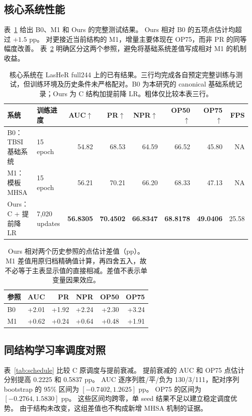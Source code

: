 \documentclass[journal]{IEEEtran}
\begin{document}
\subsection{核心系统性能}
表~\ref{tab:main} 给出 B0、M1 和 Ours 的完整测试结果。
Ours 相对 B0 的五项点估计均超过 $+1.5$ pp。
对更接近当前结构的 M1，增量主要体现在 OP75，而非 PR 的同等幅度改善。
表~\ref{tab:delta} 明确区分这两个参照，避免将基础系统差值写成相对 M1 的机制收益。

\begin{table}[t]
\centering
\caption{核心系统在 LasHeR full244 上的已有结果。三行均完成各自预定完整训练与测试，但训练环境及历史条件未严格配对。B0 为本研究的 canonical 基础系统记录；Ours 为 C 结构加提前降 LR。粗体仅比较本表三行。}
\label{tab:main}
\small
\setlength{\tabcolsep}{3pt}
\begin{tabular}{@{}llrrrrrr@{}}
\toprule
系统 & 训练进度 & AUC$\uparrow$ & PR$\uparrow$ & NPR$\uparrow$ & OP50$\uparrow$ & OP75$\uparrow$ & FPS\\
\midrule
B0：TBSI 基础系统 & 15 epoch & 54.82 & 68.53 & 64.59 & 66.52 & 45.80 & NA\\
M1：模板 MHSA & 15 epoch & 56.21 & 70.21 & 66.20 & 68.33 & 47.13 & NA\\
Ours：C + 提前降 LR & 7,020 updates & \textbf{56.8305} & \textbf{70.4502} & \textbf{66.8347} & \textbf{68.8178} & \textbf{49.0406} & 25.58\\
\bottomrule
\end{tabular}
\end{table}

\begin{table}[t]
\centering
\caption{Ours 相对两个历史参照的点估计差值（pp）。M1 差值用原归档精确值计算，再四舍五入，故不必等于主表显示值的直接相减。差值不表示单变量因果效应。}
\label{tab:delta}
\small
\setlength{\tabcolsep}{3pt}
\begin{tabular}{@{}lrrrrr@{}}
\toprule
参照 & AUC & PR & NPR & OP50 & OP75\\
\midrule
B0 & +2.01 & +1.92 & +2.24 & +2.30 & +3.24\\
M1 & +0.62 & +0.24 & +0.64 & +0.48 & +1.91\\
\bottomrule
\end{tabular}
\end{table}

\subsection{同结构学习率调度对照}
表~\ref{tab:schedule} 比较 C 原调度与提前衰减。
提前衰减的 AUC 和 OP75 点估计分别提高 0.2225 和 0.5837 pp。
AUC 逐序列胜/平/负为 130/3/111，配对序列 bootstrap 的 95\% 区间为 $[-0.7402,1.2625]$ pp。
OP75 的区间为 $[-0.2764,1.5830]$ pp。
这些区间均跨零，单 seed 结果不足以建立稳定调度优势。
由于结构未改变，这组差值也不构成新增 MHSA 机制的证据。
\end{document}
